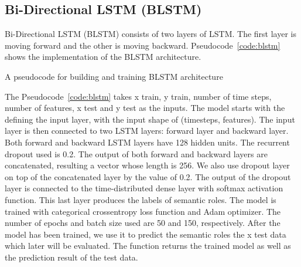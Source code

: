 \subsection{Bi-Directional LSTM (BLSTM)}
Bi-Directional LSTM (BLSTM) consists of two layers of LSTM. The first layer is moving forward and the other is moving backward. Pseudocode~\ref{code:blstm} shows the implementation of the BLSTM architecture.

\begin{kode}
	
	
	\caption{A pseudocode for building and training BLSTM architecture}
	\label{code:blstm}
\end{kode}

The Pseudocode~\ref{code:blstm} takes x train, y train, number of time steps, number of features, x test and y test as the inputs. The model starts with the defining the input layer, with the input shape of (timesteps, features). The input layer is then connected to two LSTM layers: forward layer and backward layer. Both forward and backward LSTM layers have 128 hidden units. The recurrent dropout used is 0.2. The output of both forward and backward layers are concatenated, resulting a vector whose length is 256. We also use dropout layer on top of the concatenated layer by the value of 0.2. The output of the dropout layer is connected to the time-distributed dense layer with softmax activation function. This last layer produces the labels of semantic roles. The model is trained with categorical crossentropy loss function and Adam optimizer. The number of epochs and batch size used are 50 and 150, respectively. After the model has been trained, we use it to predict the semantic roles the x test data which later will be evaluated. The function returns the trained model as well as the prediction result of the test data.


